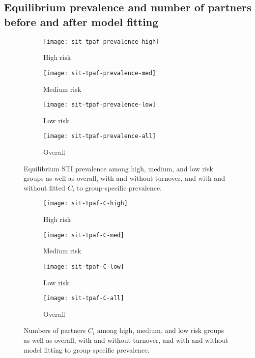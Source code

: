 \subsection{Equilibrium prevalence and number of partners before and after model fitting}
\begin{figure}[H]
  \centering
  \begin{subfigure}{0.4\linewidth}
    \centering\texttt{[image: sit-tpaf-prevalence-high]}
    \caption{High risk}
    \label{fig:tpaf-prevalence-high}
  \end{subfigure}
  \begin{subfigure}{0.4\linewidth}
    \centering\texttt{[image: sit-tpaf-prevalence-med]}
    \caption{Medium risk}
    \label{fig:tpaf-prevalence-med}
  \end{subfigure}
  \begin{subfigure}{0.4\linewidth}
    \centering\texttt{[image: sit-tpaf-prevalence-low]}
    \caption{Low risk}
    \label{fig:tpaf-prevalence-low}
  \end{subfigure}
  \begin{subfigure}{0.4\linewidth}
    \centering\texttt{[image: sit-tpaf-prevalence-all]}
    \caption{Overall}
    \label{fig:tpaf-prevalence-all}
  \end{subfigure}
  \caption{Equilibrium STI prevalence among high, medium, and low risk groups as well as overall,
    with and without turnover,
    and with and without fitted $C_i$ to group-specific prevalence.}
  \label{fig:tpaf-prevalence}
\end{figure}
\begin{figure}[H]
  \centering
  \begin{subfigure}{0.4\linewidth}
    \centering\texttt{[image: sit-tpaf-C-high]}
    \caption{High risk}
    \label{fig:tpaf-C-high}
  \end{subfigure}
  \begin{subfigure}{0.4\linewidth}
    \centering\texttt{[image: sit-tpaf-C-med]}
    \caption{Medium risk}
    \label{fig:tpaf-C-med}
  \end{subfigure}
  \begin{subfigure}{0.4\linewidth}
    \centering\texttt{[image: sit-tpaf-C-low]}
    \caption{Low risk}
    \label{fig:tpaf-C-low}
  \end{subfigure}
  \begin{subfigure}{0.4\linewidth}
    \centering\texttt{[image: sit-tpaf-C-all]}
    \caption{Overall}
    \label{fig:tpaf-C-all}
  \end{subfigure}
  \caption{Numbers of partners $C_i$
    among high, medium, and low risk groups as well as overall,
    with and without turnover,
    and with and without model fitting to group-specific prevalence.}
  \label{fig:tpaf-C}
\end{figure}
